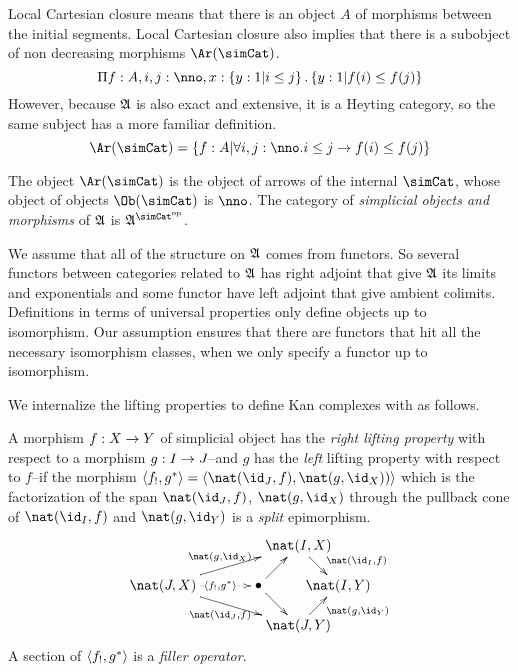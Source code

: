 \documentclass[csh.tex]{subfiles}
\begin{document}
Local Cartesian closure means that there is an object $A$ of morphisms between the initial segments. Local Cartesian closure also implies that there is a subobject of non decreasing morphisms $\Ar(\simCat)$.
\[ \Pi f\of A,i,j\of\nno,x\of\set{y\of 1|i\leq j}.\set{y\of 1|f(i)\leq f(j)}\]
However, because $\mathfrak A$ is also exact and extensive, it is a Heyting category, so the same subject has a more familiar definition.
\[ \Ar(\simCat)=\set{f\of A|\forall i,j\of\nno.i\leq j \to f(i)\leq f(j)} \]

\begin{definition} The object $\Ar(\simCat)$ is the object of arrows of the internal  $\simCat$, whose object of objects $\Ob(\simCat)$ is $\nno$. The category of \emph{simplicial objects and morphisms} of $\mathfrak A$ is $\ambient\s$.
\end{definition}

\begin{remark} We assume that all of the structure on $\mathfrak A$ comes from functors. So several functors between categories related to $\mathfrak A$ has right adjoint that give $\mathfrak A$ its limits and exponentials and some functor have left adjoint that give ambient colimits. Definitions in terms of universal properties only define objects up to isomorphism. Our assumption ensures that there are functors that hit all the necessary isomorphism classes, when we only specify a functor up to isomorphism.
\end{remark}

We internalize the lifting properties to define Kan complexes with as follows.

\begin{definition}
A morphism $f: X\to Y$ of simplicial object has the \emph{right lifting property} with respect to a morphism $g: I\to J$--and $g$ has the \emph{left} lifting property with respect to $f$--if the morphism $\tuplet{f_!,g\ri} = \tuplet{\nat(\id_J,f),\nat(g,\id_X))}$ 
which is the factorization of the span $\nat(\id_J,f)$, $\nat(g,\id_X)$ through the pullback cone of $\nat(\id_I,f)$ and $\nat(g,\id_Y)$
is a \emph{split} epimorphism.
\[\xy
(34,20)*+{\nat(I,X)}="top",(0,10)*+{\nat(J,X)}="left",(24,10)*+{\bullet}="middle",(44,10)*+{\nat(I,Y)}="right",(34,0)*+{\nat(J,Y)}="bottom"
\ar^{\nat(g,\id_X)} "left";"top" \ar@{.>}|(.6){\tuplet{f_!,g\ri}} "left";"middle" \ar_{\nat(\id_J,f)} "left";"bottom" \ar "middle";"bottom"
\ar "middle";"top" \ar^(.6){\nat(\id_I,f)} "top";"right" \ar_(.6){\nat(g,\id_Y)} "bottom";"right"
\endxy\]
A section of $\left\langle f_!,g^* \right\rangle$ is a \emph{filler operator}.\label{lifting}
\end{definition}
\end{document}
